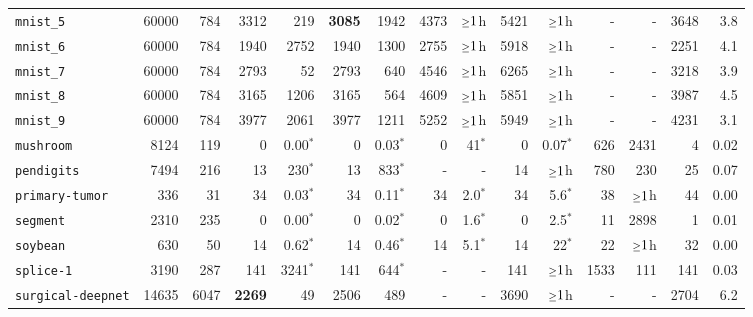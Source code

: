 \begin{tabular}{lccrrrrrrrrrrrr}
\texttt{mnist\_5} & \multicolumn{1}{r}{60000} & \multicolumn{1}{r}{784}  & 3312 & 219 & \textbf{3085} & 1942 & 4373 & $\mathsmaller{\geq}1$h & 5421 & $\mathsmaller{\geq}1$h & - & - & 3648 & 3.8\\
\texttt{mnist\_6} & \multicolumn{1}{r}{60000} & \multicolumn{1}{r}{784}  & 1940 & 2752 & 1940 & 1300 & 2755 & $\mathsmaller{\geq}1$h & 5918 & $\mathsmaller{\geq}1$h & - & - & 2251 & 4.1\\
\texttt{mnist\_7} & \multicolumn{1}{r}{60000} & \multicolumn{1}{r}{784}  & 2793 & 52 & 2793 & 640 & 4546 & $\mathsmaller{\geq}1$h & 6265 & $\mathsmaller{\geq}1$h & - & - & 3218 & 3.9\\
\texttt{mnist\_8} & \multicolumn{1}{r}{60000} & \multicolumn{1}{r}{784}  & 3165 & 1206 & 3165 & 564 & 4609 & $\mathsmaller{\geq}1$h & 5851 & $\mathsmaller{\geq}1$h & - & - & 3987 & 4.5\\
\texttt{mnist\_9} & \multicolumn{1}{r}{60000} & \multicolumn{1}{r}{784}  & 3977 & 2061 & 3977 & 1211 & 5252 & $\mathsmaller{\geq}1$h & 5949 & $\mathsmaller{\geq}1$h & - & - & 4231 & 3.1\\
\texttt{mushroom} & \multicolumn{1}{r}{8124} & \multicolumn{1}{r}{119}  & 0 & 0.00$^*$ & 0 & 0.03$^*$ & 0 & 41$^*$ & 0 & 0.07$^*$ & 626 & 2431 & 4 & 0.02\\
\texttt{pendigits} & \multicolumn{1}{r}{7494} & \multicolumn{1}{r}{216}  & 13 & 230$^*$ & 13 & 833$^*$ & - & - & 14 & $\mathsmaller{\geq}1$h & 780 & 230 & 25 & 0.07\\
\texttt{primary-tumor} & \multicolumn{1}{r}{336} & \multicolumn{1}{r}{31}  & 34 & 0.03$^*$ & 34 & 0.11$^*$ & 34 & 2.0$^*$ & 34 & 5.6$^*$ & 38 & $\mathsmaller{\geq}1$h & 44 & 0.00\\
\texttt{segment} & \multicolumn{1}{r}{2310} & \multicolumn{1}{r}{235}  & 0 & 0.00$^*$ & 0 & 0.02$^*$ & 0 & 1.6$^*$ & 0 & 2.5$^*$ & 11 & 2898 & 1 & 0.01\\
\texttt{soybean} & \multicolumn{1}{r}{630} & \multicolumn{1}{r}{50}  & 14 & 0.62$^*$ & 14 & 0.46$^*$ & 14 & 5.1$^*$ & 14 & 22$^*$ & 22 & $\mathsmaller{\geq}1$h & 32 & 0.00\\
\texttt{splice-1} & \multicolumn{1}{r}{3190} & \multicolumn{1}{r}{287}  & 141 & 3241$^*$ & 141 & 644$^*$ & - & - & 141 & $\mathsmaller{\geq}1$h & 1533 & 111 & 141 & 0.03\\
\texttt{surgical-deepnet} & \multicolumn{1}{r}{14635} & \multicolumn{1}{r}{6047}  & \textbf{2269} & 49 & 2506 & 489 & - & - & 3690 & $\mathsmaller{\geq}1$h & - & - & 2704 & 6.2\\

\end{tabular}
